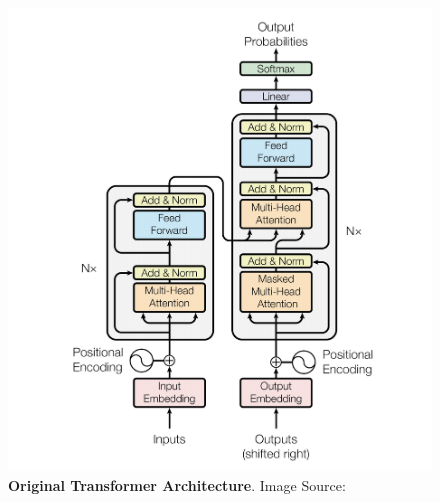 \begin{figure}[!htbp]
    \begin{centering}
        \includegraphics{img/transformer}
        \caption[Original Transformer Architecture]{\textbf{Original Transformer Architecture}. Image Source: \cite{vaswani_attention_2017}
        }
        \label{fig:transformer}
    \end{centering}
\end{figure}

